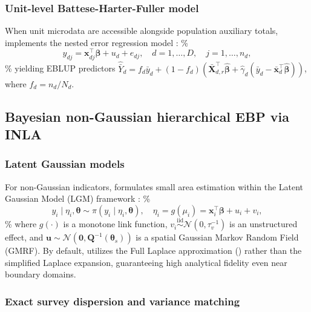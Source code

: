 \subsubsection{Unit-level Battese-Harter-Fuller model}

When unit microdata are accessible alongside population auxiliary totals,  implements the nested error regression model \citep{battese1988error}:
\%
\begin{equation} \label{eq:bhf_model}
y_{dj} = \bm{x}_{dj}^\top \bm{\beta} + u_d + e_{dj}, \quad d = 1, \dots, D, \quad j = 1, \dots, n_d,
\end{equation}
\%
yielding EBLUP predictors \(\hat{\bar{Y}}_d = f_d \bar{y}_d + (1 - f_d)(\bar{\bm{X}}_{d, r}^\top \hat{\bm{\beta}} + \hat{\gamma}_d (\bar{y}_d - \bar{\bm{x}}_d^\top \hat{\bm{\beta}}))\), where \(f_d = n_d / N_d\).

\subsection{Bayesian non-Gaussian hierarchical EBP via INLA} \label{sec:methods_inla}

\subsubsection{Latent Gaussian models}

For non-Gaussian indicators,  formulates small area estimation within the Latent Gaussian Model (LGM) framework \citep{rue2009approximate}:
\%
\begin{equation} \label{eq:lgm_formulation}
y_i \mid \eta_i, \bm{\theta} \sim \pi(y_i \mid \eta_i, \bm{\theta}), \quad \eta_i = g(\mu_i) = \bm{x}_i^\top \bm{\beta} + u_i + v_i,
\end{equation}
\%
where \(g(\cdot)\) is a monotone link function, \(v_i \overset{\mathrm{iid}}{\sim} \mathcal{N}(0, \tau_v^{-1})\) is an unstructured effect, and \(\bm{u} \sim \mathcal{N}(\bm{0}, \bm{Q}^{-1}(\bm{\theta}_s))\) is a spatial Gaussian Markov Random Field (GMRF). By default,  utilizes the Full Laplace approximation () rather than the simplified Laplace expansion, guaranteeing high analytical fidelity even near boundary domains.

\subsubsection{Exact survey dispersion and variance matching}

